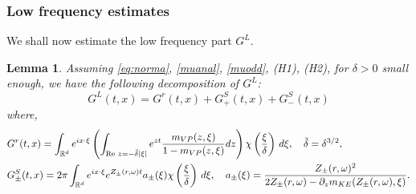 \documentclass[11pt]{amsart}
\numberwithin{equation}{section}
\newtheorem{lem}{Lemma}[section]
\begin{document}
  \subsubsection{Low frequency estimates}
     
     We shall now estimate the low frequency part $G^L$.
     
  \begin{lem}
  \label{lemGL}
  Assuming \eqref{eq:norma}, \eqref{muanal}, \eqref{muodd}, (H1), (H2), for $\delta >0$ small enough,  
  we have the following  decomposition of $G^L$:
 \begin{equation}
 \label{GLdec-prop}
 G^L(t,x) = G^r(t,x)  + G^S_{+}(t,x) + G^S_{-}(t,x)
 \end{equation}
 where, 
 \begin{align*}
  & G^r(t,x) =   \int_{\mathbb{R}^d} e^{ix \cdot \xi} \left( \int_{\operatorname{Re}\, z=- \tilde \delta |\xi| }   e^{z t } { m_{VP}(z,\xi) \over 1-m_{VP}(z, \xi)}dz \right) \chi \left( { \xi \over \delta}  \right)  \, d\xi, \quad \tilde\delta = \delta^{3/2},\\
 & G^S_{\pm}(t,x) =  2\pi  \int_{\mathbb{R}^d} e^{ix \cdot \xi} e^{ Z_{\pm}(r, \omega) t}   a_{\pm}(\xi)  \chi \left( { \xi \over \delta} \right)  \, d\xi,
  \quad a_{\pm}(\xi)=  { Z_{\pm}(r, \omega)^2 \over  2 Z_{\pm}(r, \omega) - \partial_{z}m_{KE}(Z_{\pm}(r, \omega), \xi)}.
 \end{align*}

  \end{lem}
\end{document}
